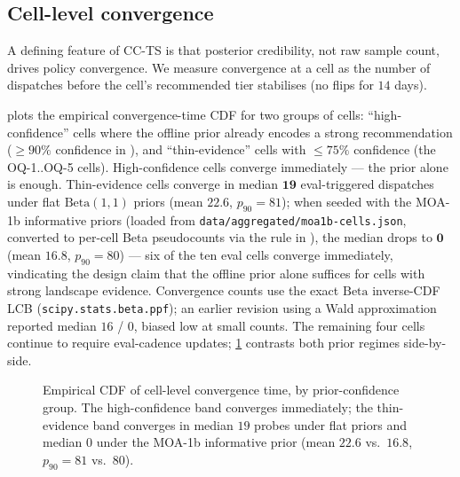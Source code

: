 \subsection{Cell-level convergence}

A defining feature of CC-TS is that posterior credibility, not raw sample
count, drives policy convergence. We measure convergence at a cell as the
number of dispatches before the cell's recommended tier stabilises (no
flips for $14$ days).

 plots the empirical convergence-time CDF for two
groups of cells: ``high-confidence'' cells where the offline prior already
encodes a strong recommendation ($\geq 90\%$ confidence in
\cite{blackrim_moa1b}), and ``thin-evidence'' cells with $\leq 75\%$
confidence (the OQ-1..OQ-5 cells). High-confidence cells converge
immediately --- the prior alone is enough. Thin-evidence cells converge in median $\mathbf{19}$ eval-triggered
dispatches under flat $\mathrm{Beta}(1,1)$ priors
(mean $22.6$, $p_{90}=81$); when seeded with the MOA-1b informative
priors (loaded from \texttt{data/aggregated/moa1b-cells.json}, converted
to per-cell Beta pseudocounts via the rule in \cite{blackrim_moa1b}),
the median drops to $\mathbf{0}$ (mean $16.8$, $p_{90}=80$) --- six of
the ten eval cells converge immediately, vindicating the design claim
that the offline prior alone suffices for cells with strong landscape
evidence. Convergence counts use the exact $\mathrm{Beta}$ inverse-CDF
LCB (\texttt{scipy.stats.beta.ppf}); an earlier revision using a Wald
approximation reported median $16$ / $0$, biased low at small counts.
The remaining four cells continue to require eval-cadence updates;
\cref{fig:convergence} contrasts both prior regimes side-by-side.

\begin{figure}[ht]
\centering

\caption{Empirical CDF of cell-level convergence time, by prior-confidence
group. The high-confidence band converges immediately; the thin-evidence
band converges in median $19$ probes under flat priors and median $0$ under the MOA-1b informative prior (mean $22.6$ vs.\ $16.8$, $p_{90}=81$ vs.\ $80$).}
\label{fig:convergence}
\end{figure}

